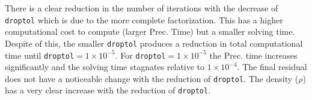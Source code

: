 \documentclass[a4paper, 11pt]{article}
\begin{document}
			There is a clear reduction in the number of iterations with the decrease of \texttt{droptol} which is due to the more complete factorization.
			This has a higher computational cost to compute (larger Prec. Time) but a smaller solving time.
			Despite of this, the smaller \texttt{droptol} produces a reduction in total computational time until \texttt{droptol}$ = 1\times 10^{-5}$.
			For \texttt{droptol}$  = 1\times 10^{-5} $ the Prec. time increases significantly and the solving time stagnates relative to $ 1\times 10^{-4} $.  
			The final residual does not have a noticeable change with the reduction of \texttt{droptol}.
			The density ($ \rho $) has a very clear increase with the reduction of \texttt{droptol}.			
	
\end{document}
